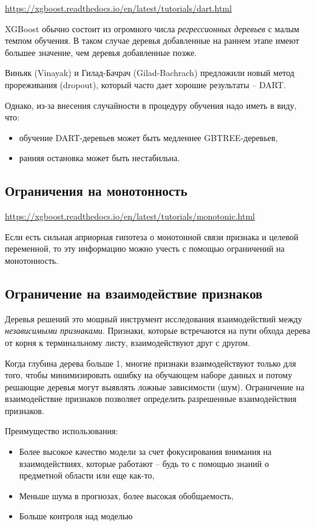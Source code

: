 \documentclass[%
	11pt,
	a4paper,
	utf8,
		]{article}
\begin{document}
\url{https://xgboost.readthedocs.io/en/latest/tutorials/dart.html}

XGBoost обычно состоит из огромного числа \emph{регрессионных деревьев} с малым темпом обучения. В таком случае деревья добавленные на раннем этапе имеют большее значение, чем деревья добавленные позже.

 Виньяк (Vinayak) и Гилад-Бачрач (Gilad-Bachrach) \cite{dart:2015} предложили новый метод прореживания (dropout), который часто дает хорошие результаты -- DART.
 
 Однако, из-за внесения случайности в процедуру обучения надо иметь в виду, что:
 \begin{itemize}
 	\item  обучение DART-деревьев может быть медленнее GBTREE-деревьев,
 	
 	\item ранняя остановка может быть нестабильна.
 \end{itemize}

\subsection{Ограничения на монотонность}

\url{https://xgboost.readthedocs.io/en/latest/tutorials/monotonic.html}

Если есть сильная априорная гипотеза о монотонной связи признака и целевой переменной, то эту информацию можно учесть с помощью ограничений на монотонность.

\subsection{Ограничение на взаимодействие признаков}

Деревья решений это мощный инструмент исследования взаимодействий между \emph{независимыми признаками}. Признаки, которые встречаются на пути обхода дерева от корня к терминальному листу, взаимодействуют друг с другом.

Когда глубина дерева больше 1, многие признаки взаимодействуют только для того, чтобы минимизировать ошибку на обучающем наборе данных и потому решающие деревья могут выявлять ложные зависимости (шум). Ограничение на взаимодействие признаков позволяет определить разрешенные взаимодействия признаков.

Преимущество использования:
\begin{itemize}
	\item Более высокое качество модели за счет фокусирования внимания на взаимодействиях, которые работают -- будь то с помощью знаний о предметной области или еще как-то,
	
	\item Меньше шума в прогнозах, более высокая обобщаемость,
	
	\item Больше контроля над моделью
\end{itemize}
\end{document}
